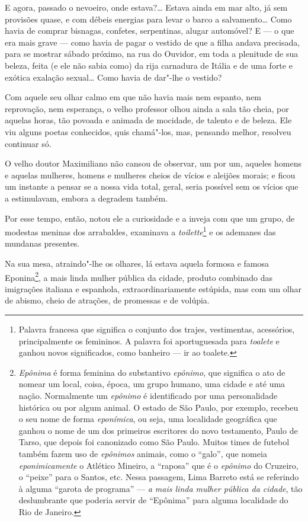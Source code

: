 E agora, passado o nevoeiro, onde estava?\ldots{} Estava ainda em mar alto,
já sem provisões quase, e com débeis energias para levar o barco a
salvamento\ldots{} Como havia de comprar bisnagas, confetes, serpentinas,
alugar automóvel? E --- o que era mais grave --- como havia de pagar o
vestido de que a filha andava precisada, para se mostrar sábado próximo,
na rua do Ouvidor, em toda a plenitude de sua beleza, feita (e ele não
sabia como) da rija carnadura de Itália e de uma forte e exótica
exalação sexual\ldots{} Como havia de dar"-lhe o vestido?

Com aquele seu olhar calmo em que não havia mais nem espanto, nem
reprovação, nem esperança, o velho professor olhou ainda a sala tão
cheia, por aquelas horas, tão povoada e animada de mocidade, de talento
e de beleza. Ele viu alguns poetas conhecidos, quis chamá"-los, mas,
pensando melhor, resolveu continuar só.

O velho doutor Maximiliano não cansou de observar, um por um, aqueles
homens e aquelas mulheres, homens e mulheres cheios de vícios e aleijões
morais; e ficou um instante a pensar se a nossa vida total, geral, seria
possível sem os vícios que a estimulavam, embora a degradem também.

Por esse tempo, então, notou ele a curiosidade e a inveja com que um
grupo, de modestas meninas dos arrabaldes, examinava a
\emph{toilette}\footnote{Palavra francesa que significa o conjunto dos
  trajes, vestimentas, acessórios, principalmente os femininos. A
  palavra foi aportuguesada para \emph{toalete} e ganhou novos
  significados, como banheiro --- ir ao toalete.} e os ademanes das
mundanas presentes.

Na sua mesa, atraindo"-lhe os olhares, lá estava aquela formosa e famosa
Eponina\footnote{\emph{Epônima} é forma feminina do substantivo
  \emph{epônimo}, que significa o ato de nomear um local, coisa, época,
  um grupo humano, uma cidade e até uma nação. Normalmente um
  \emph{epônimo} é identificado por uma personalidade histórica ou por
  algum animal. O estado de São Paulo, por exemplo, recebeu o seu nome
  de forma \emph{eponímica}, ou seja, uma localidade geográfica que
  ganhou o nome de um dos primeiros escritores do novo testamento, Paulo
  de Tarso, que depois foi canonizado como São Paulo. Muitos times de
  futebol também fazem uso de \emph{epônimos} animais, como o ``galo'',
  que nomeia \emph{eponimicamente} o Atlético Mineiro, a ``raposa'' que
  é o \emph{epônimo} do Cruzeiro, o ``peixe'' para o Santos, etc. Nessa
  passagem, Lima Barreto está se referindo à alguma ``garota de
  programa'' --- \emph{a mais linda mulher pública da cidade}, tão
  deslumbrante que poderia servir de ``Epônima'' para alguma localidade
  do Rio de Janeiro.}, a mais linda mulher pública da cidade, produto
combinado das imigrações italiana e espanhola, extraordinariamente
estúpida, mas com um olhar de abismo, cheio de atrações, de promessas e
de volúpia.


